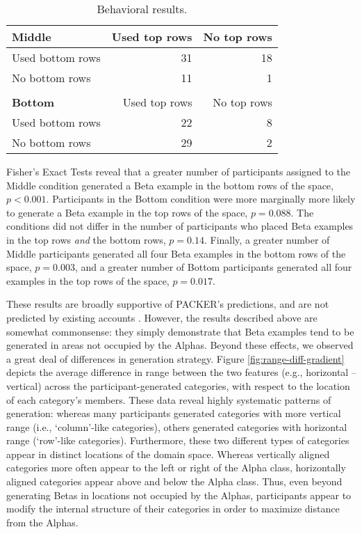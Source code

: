 \documentclass[10pt,letterpaper]{article}
\begin{document}
\begin{table}
\begin{center} 
\caption{Behavioral results.} 
\label{table:subset-table} 
\vskip 0.12in
\begin{tabular}{ l r r}
    \textbf{Middle}         & Used top rows & No top rows \\
    \hline
    Used bottom rows        &  31 & 18  \\
    No bottom rows          &  11 &  1  \\
    \\
    \textbf{Bottom}         & Used top rows & No top rows \\
    \hline
    Used bottom rows        & 22 & 8 \\
    No bottom rows          & 29 & 2 \\
\end{tabular}
\end{center} 
\end{table}


Fisher's Exact Tests reveal that a greater number of participants assigned to the Middle condition generated a Beta example in the bottom rows of the space, $p < 0.001$. Participants in the Bottom condition were more marginally more likely to generate a Beta example in the top rows of the space, $p = 0.088$. The conditions did not differ in the number of participants who placed Beta examples in the top rows \textit{and} the bottom rows, $p = 0.14$. Finally, a greater number of Middle participants generated all four Beta examples in the bottom rows of the space, $p = 0.003$, and a greater number of Bottom participants generated all four examples in the top rows of the space, $p = 0.017$. 

These results are broadly supportive of PACKER's predictions, and are not predicted by existing accounts \citep[i.e.,][]{jern2013probabilistic}. However, the results described above are somewhat commonsense: they simply demonstrate that Beta examples tend to be generated in areas not occupied by the Alphas. Beyond these effects, we observed a great deal of differences in generation strategy. Figure \ref{fig:range-diff-gradient} depicts the average difference in range between the two features (e.g., horizontal -- vertical) across the participant-generated categories, with respect to the location of each category's members. These data reveal highly systematic patterns of generation: whereas many participants generated categories with more vertical range (i.e., `column'-like categories), others generated categories with horizontal range (`row'-like categories). Furthermore, these two different types of categories appear in distinct locations of the domain space. Whereas vertically aligned categories more often appear to the left or right of the Alpha class, horizontally aligned categories appear above and below the Alpha class. Thus, even beyond generating Betas in locations not occupied by the Alphas, participants appear to modify the internal structure of their categories in order to maximize distance from the Alphas.
\end{document}
